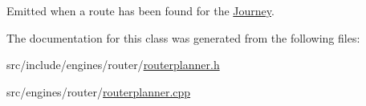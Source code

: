 Emitted when a route has been found for the \mbox{\hyperlink{classQRail_1_1RouterEngine_1_1Journey}{Journey}}. 



The documentation for this class was generated from the following files\+:\begin{DoxyCompactItemize}
\item 
src/include/engines/router/\mbox{\hyperlink{routerplanner_8h}{routerplanner.\+h}}\item 
src/engines/router/\mbox{\hyperlink{routerplanner_8cpp}{routerplanner.\+cpp}}\end{DoxyCompactItemize}
